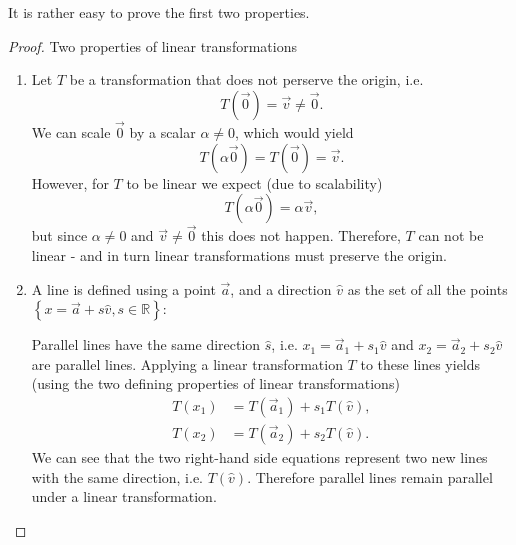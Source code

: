 It is rather easy to prove the first two properties.
\begin{proof}{Two properties of linear transformations}{}
	\begin{enumerate}
		\item Let $T$ be a transformation that does not perserve the origin, i.e.
	\[
		T\left(\vec{0}\right) = \vec{v} \neq \vec{0}.
	\]
	We can scale $\vec{0}$ by a scalar $\alpha\neq0$, which would yield
	\[
		T\left(\alpha\vec{0}\right) = T\left(\vec{0}\right) = \vec{v}.
	\]
	However, for $T$ to be linear we expect (due to scalability)
	\[
		T\left(\alpha\vec{0}\right) = \alpha\vec{v},
	\]
	but since $\alpha\neq0$ and $\vec{v}\neq\vec{0}$ this does not happen. Therefore, $T$ can not be linear - and in turn linear transformations must preserve the origin.

	\item A line is defined using a point $\vec{a}$, and a direction $\hat{v}$ as the set of all the points $\left\{x=\vec{a}+s\hat{v}, s\in\mathbb{R}\right\}$:

	\begin{center}
	\end{center}
	Parallel lines have the same direction $\hat{s}$, i.e. $x_{1}=\vec{a}_{1}+s_{1}\hat{v}$ and $x_{2}=\vec{a}_{2}+s_{2}\hat{v}$ are parallel lines. Applying a linear transformation $T$ to these lines yields (using the two defining properties of linear transformations)
	\begin{align*}
		T\left(x_{1}\right) &= T\left(\vec{a}_{1}\right) + s_{1}T\left(\hat{v}\right),\\
		T\left(x_{2}\right) &= T\left(\vec{a}_{2}\right) + s_{2}T\left(\hat{v}\right).
	\end{align*}
	We can see that the two right-hand side equations represent two new lines with the same direction, i.e. $T\left(\hat{v}\right)$. Therefore parallel lines remain parallel under a linear transformation.
	\end{enumerate}
\end{proof}


